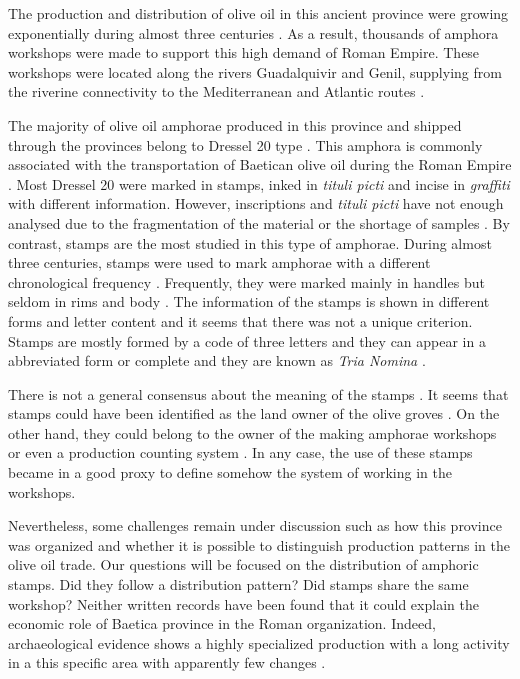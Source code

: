\documentclass[review]{elsarticle}
\begin{document}
The production and distribution of olive oil in this ancient province were growing exponentially during almost three centuries \citep{remesal_concierto}. As a result, thousands of amphora workshops were made to support this high demand of Roman Empire. These workshops were located along the rivers Guadalquivir and Genil, supplying from the riverine connectivity to the Mediterranean and Atlantic routes \citep{garcia_vargas_enrique_formal_2010}. 

The majority of olive oil amphorae produced in this province and shipped through the provinces belong to Dressel 20 type \citep{dressel,martin-kilcher_romischen_1994}. This amphora is commonly associated with the transportation of Baetican olive oil during the Roman Empire \citep{berni_millet_epigrafianforica_2008}. Most Dressel 20 were marked in stamps, inked in \textit{tituli picti} and incise in \textit{graffiti} with different information. However, inscriptions and \textit{tituli picti} have not enough analysed due to the fragmentation of the material or the shortage of samples \citep{aguilera_evolucion_2007,rovira_guardiola_grafitos_2007}. By contrast, stamps are the most studied in this type of amphorae. During almost three centuries, stamps were used to mark amphorae with a different chronological frequency \citep{remesal_sellar_2016}. Frequently, they were marked mainly in handles but seldom in rims and body \citep{millet_anforas_1998}. 
The information of the stamps is shown in different forms and letter content and it seems that there was not a unique criterion. Stamps are mostly formed by a code of three letters and they can appear in a abbreviated form or complete and they are known as \textit{Tria Nomina} \citep{berni_millet_amphora_1996}. 

 There is not a general consensus about the meaning of the stamps \citep{rodriguez_baetican_1998}. It seems that stamps could have been identified as the land owner of the olive groves \citep{rodriguez_economioleicola_1977}. On the other hand, they could belong to the owner of the making amphorae workshops or even a production counting system  \citep{berni_millet_epigrafianforica_2008}. In any case, the use of these stamps became in a good proxy to define somehow the system of working in the workshops. 

Nevertheless, some challenges remain under discussion such as how this province was organized and whether it is possible to distinguish production patterns in the olive oil trade. Our questions will be focused on the distribution of amphoric stamps. Did they follow a distribution pattern? Did stamps share the same workshop? Neither written records have been found that it could explain the economic role of Baetica province in the Roman organization. Indeed, archaeological evidence shows a highly specialized production with a long activity in a this specific area with apparently few changes \citep{remesal_anforas_2004}. 
\end{document}
